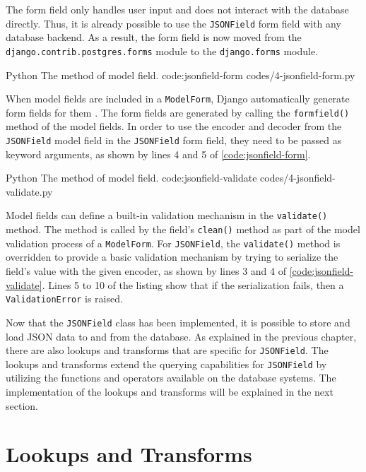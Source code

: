 The form field only handles user input and does not interact with the database
directly. Thus, it is already possible to use the \verb|JSONField| form field
with any database backend. As a result, the form field is now moved from the
\verb|django.contrib.postgres.forms| module to the \verb|django.forms| module.

\listing
{Python}
{The  method of  model field.}
{code:jsonfield-form}
{codes/4-jsonfield-form.py}

When model fields are included in a \verb|ModelForm|, Django automatically
generate form fields for them \cite{django:modelform}. The form fields are
generated by calling the \verb|formfield()| method of the model fields. In
order to use the encoder and decoder from the \verb|JSONField| model field in
the \verb|JSONField| form field, they need to be passed as keyword arguments,
as shown by lines 4 and 5 of \autoref{code:jsonfield-form}.

\listing
{Python}
{The  method of  model field.}
{code:jsonfield-validate}
{codes/4-jsonfield-validate.py}

Model fields can define a built-in validation mechanism in the
\verb|validate()| method. The method is called by the field's \verb|clean()|
method as part of the model validation process of a \verb|ModelForm|. For
\verb|JSONField|, the \verb|validate()| method is overridden to provide a
basic validation mechanism by trying to serialize the field's value with the
given encoder, as shown by lines 3 and 4 of \autoref{code:jsonfield-validate}.
Lines 5 to 10 of the listing show that if the serialization fails, then a
\verb|ValidationError| is raised.

Now that the \verb|JSONField| class has been implemented, it is possible to
store and load JSON data to and from the database. As explained in the previous
chapter, there are also lookups and transforms that are specific for
\verb|JSONField|. The lookups and transforms extend the querying capabilities
for \verb|JSONField| by utilizing the functions and operators available on the
database systems. The implementation of the lookups and transforms will be
explained in the next section.

\section{ Lookups and Transforms}

